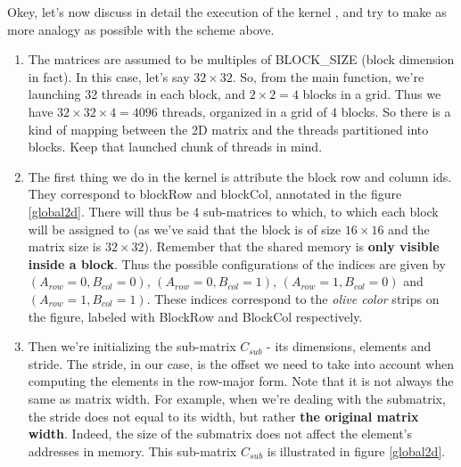 Okey, let's now discuss in detail the execution of the kernel \verb||, and try to make as more analogy as possible
with the scheme above.
\begin{enumerate}
   \item The matrices are assumed to be multiples of BLOCK\_SIZE (block dimension in fact). In this case, let's say $32\times 32$. So, 
   from the main function, we're launching 32 threads in each block, and $2\times 2 = 4$ blocks in a grid. Thus we have 
   $32\times 32\times 4=4096 \text{ threads}$, organized in a grid of 4 blocks. So there is a kind of mapping between 
   the 2D matrix and the threads partitioned into blocks.
   Keep that launched chunk of threads in mind. 
   \item The first thing we do in the kernel is attribute the block row and column ids. They correspond to blockRow and blockCol, 
   annotated in the figure \ref{global2d}. There will thus be 4 sub-matrices to which, to which each block will be assigned to (as we've said 
   that the block is of size $16\times 16$ and the matrix size is $32\times 32$). Remember that
   the shared memory is \textbf{only visible inside a block}. Thus the possible configurations of the indices are given by 
   $(A_{row}=0, B_{col}=0)$, $(A_{row}=0, B_{col}=1)$, $(A_{row}=1, B_{col}=0)$ and $(A_{row}=1, B_{col}=1)$. These indices correspond to the 
   \textit{olive color} strips on the figure, labeled with BlockRow and BlockCol respectively.
   \item Then we're initializing the sub-matrix $C_{sub}$ - its dimensions, elements and stride.
    The stride, in our case, is the offset we need to take into account when computing the elements in the row-major form. Note that it is not always
    the same as matrix width. For example, when we're dealing with the submatrix, the stride does not equal to its width, but rather 
    \textbf{the original matrix width}. Indeed, the size of the submatrix does not affect the element's addresses in memory.
    This sub-matrix $C_{sub}$ is illustrated in figure \ref{global2d}. 



\end{enumerate}
